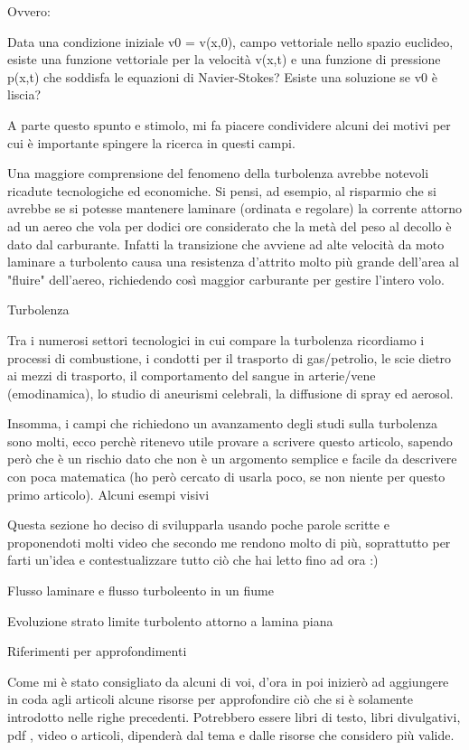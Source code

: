 Ovvero:

Data una condizione iniziale v0 = v(x,0), campo vettoriale nello spazio euclideo, esiste una funzione vettoriale per la velocità v(x,t) e una funzione di pressione p(x,t) che soddisfa le equazioni di Navier-Stokes? Esiste una soluzione se v0 è liscia?

A parte questo spunto e stimolo, mi fa piacere condividere alcuni dei motivi per cui è importante spingere la ricerca in questi campi.

Una maggiore comprensione del fenomeno della turbolenza avrebbe notevoli ricadute tecnologiche ed economiche. Si pensi, ad esempio, al risparmio che si avrebbe se si potesse mantenere laminare (ordinata e regolare) la corrente attorno ad un aereo che vola per dodici ore considerato che la metà del peso al decollo è dato dal carburante. Infatti la transizione che avviene ad alte velocità da moto laminare a turbolento causa una resistenza d'attrito molto più grande dell'area al "fluire" dell'aereo, richiedendo così maggior carburante per gestire l'intero volo.

Turbolenza

Tra i numerosi settori tecnologici in cui compare la turbolenza ricordiamo i processi di combustione, i condotti per il trasporto di gas/petrolio, le scie dietro ai mezzi di trasporto, il comportamento del sangue in arterie/vene (emodinamica), lo studio di aneurismi celebrali, la diffusione di spray ed aerosol.

Insomma, i campi che richiedono un avanzamento degli studi sulla turbolenza sono molti, ecco perchè ritenevo utile provare a scrivere questo articolo, sapendo però che è un rischio dato che non è un argomento semplice e facile da descrivere con poca matematica (ho però cercato di usarla poco, se non niente per questo primo articolo).
Alcuni esempi visivi

Questa sezione ho deciso di svilupparla usando poche parole scritte e proponendoti molti video che secondo me rendono molto di più, soprattutto per farti un'idea e contestualizzare tutto ciò che hai letto fino ad ora :)

Flusso laminare e flusso turboleento in un fiume

Evoluzione strato limite turbolento attorno a lamina piana

Riferimenti per approfondimenti

Come mi è stato consigliato da alcuni di voi, d'ora in poi inizierò ad aggiungere in coda agli articoli alcune risorse per approfondire ciò che si è solamente introdotto nelle righe precedenti. Potrebbero essere libri di testo, libri divulgativi, pdf , video o articoli, dipenderà dal tema e dalle risorse che considero più valide.

